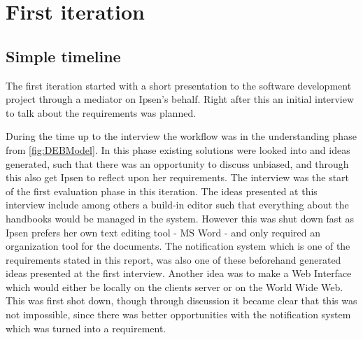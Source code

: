 \section{First iteration}\label{sec:Iteration1}
\subsection{Simple timeline}\label{sec:1-simpleTime}
The first iteration started with a short presentation to the software development project through a mediator on Ipsen's behalf.
Right after this an initial interview to talk about the requirements was planned.

During the time up to the interview the workflow was in the understanding phase from \cref{fig:DEBModel}.
In this phase existing solutions were looked into and ideas generated, such that there was an opportunity to discuss unbiased, and through this also get Ipsen to reflect upon her requirements.
The interview was the start of the first evaluation phase in this iteration.
The ideas presented at this interview include among others a build-in editor such that everything about the handbooks would be managed in the system.
However this was shut down fast as Ipsen prefers her own text editing tool - MS Word - and only required an organization tool for the documents.
The notification system which is one of the requirements stated in this report, was also one of these beforehand generated ideas presented at the first interview. 
Another idea was to make a Web Interface which would either be locally on the clients server or on the World Wide Web.
This was first shot down, though through discussion it became clear that this was not impossible, since there was better opportunities with the notification system which was turned into a requirement.

